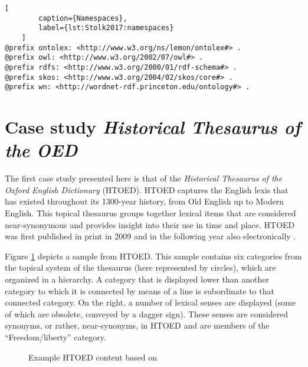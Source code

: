 \noindent
\begin{minipage}[c]{\textwidth}
	\begin{lstlisting}[
		caption={Namespaces},
		label={lst:Stolk2017:namespaces}
	]
@prefix ontolex: <http://www.w3.org/ns/lemon/ontolex#> .
@prefix owl: <http://www.w3.org/2002/07/owl#> .
@prefix rdfs: <http://www.w3.org/2000/01/rdf-schema#> .
@prefix skos: <http://www.w3.org/2004/02/skos/core#> .
@prefix wn: <http://wordnet-rdf.princeton.edu/ontology#> .
	\end{lstlisting}
\end{minipage}


\section{Case study \textit{Historical Thesaurus of the OED}}

The first case study presented here is that of the \textit{Historical Thesaurus of the Oxford English Dictionary} (HTOED). HTOED captures the English lexis that has existed throughout its 1300-year history, from Old English up to Modern English. This topical thesaurus groups together lexical items that are considered near-synonymous and provides insight into their use in time and place. HTOED was first published in print in 2009 \cite{kay_historical_2009} and in the following year also electronically \cite{kay_historical_2010}.

Figure \ref{fig:Stolk2017:HTE} depicts a sample from HTOED. This sample contains six categories from the topical system of the thesaurus (here represented by circles), which are organized in a hierarchy. A category that is displayed lower than another category to which it is connected by means of a line is subordinate to that connected category. On the right, a number of lexical senses are displayed (some of which are obsolete, conveyed by a dagger sign). These senses are considered synonyms, or rather, near-synonyms, in HTOED and are members of the ``Freedom/liberty'' category.

\begin{figure}[htbp]
	\framebox[\textwidth]{
		\scalebox{0.65}[0.65]{
			
		}
	}
	\caption[]{\label{fig:Stolk2017:HTE} Example HTOED content based on  \cite{kay_historical_2010}}
\end{figure} 

